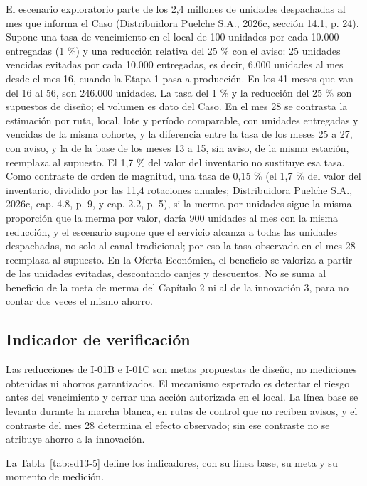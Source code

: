El escenario exploratorio parte de los 2,4 millones de unidades despachadas al mes que informa el Caso (Distribuidora Puelche S.A., 2026c, sección 14.1, p. 24). Supone una tasa de vencimiento en el local de 100 unidades por cada 10.000 entregadas (1 \%) y una reducción relativa del 25 \% con el aviso: 25 unidades vencidas evitadas por cada 10.000 entregadas, es decir, 6.000 unidades al mes desde el mes 16, cuando la Etapa 1 pasa a producción. En los 41 meses que van del 16 al 56, son 246.000 unidades. La tasa del 1 \% y la reducción del 25 \% son supuestos de diseño; el volumen es dato del Caso. En el mes 28 se contrasta la estimación por ruta, local, lote y período comparable, con unidades entregadas y vencidas de la misma cohorte, y la diferencia entre la tasa de los meses 25 a 27, con aviso, y la de la base de los meses 13 a 15, sin aviso, de la misma estación, reemplaza al supuesto. El 1,7 \% del valor del inventario no sustituye esa tasa. Como contraste de orden de magnitud, una tasa de 0,15 \% (el 1,7 \% del valor del inventario, dividido por las 11,4 rotaciones anuales; Distribuidora Puelche S.A., 2026c, cap. 4.8, p. 9, y cap. 2.2, p. 5), si la merma por unidades sigue la misma proporción que la merma por valor, daría 900 unidades al mes con la misma reducción, y el escenario supone que el servicio alcanza a todas las unidades despachadas, no solo al canal tradicional; por eso la tasa observada en el mes 28 reemplaza al supuesto. En la Oferta Económica, el beneficio se valoriza a partir de las unidades evitadas, descontando canjes y descuentos. No se suma al beneficio de la meta de merma del Capítulo 2 ni al de la innovación 3, para no contar dos veces el mismo ahorro.

\subsection{Indicador de verificación}

Las reducciones de I-01B e I-01C son metas propuestas de diseño, no mediciones obtenidas ni ahorros garantizados. El mecanismo esperado es detectar el riesgo antes del vencimiento y cerrar una acción autorizada en el local. La línea base se levanta durante la marcha blanca, en rutas de control que no reciben avisos, y el contraste del mes 28 determina el efecto observado; sin ese contraste no se atribuye ahorro a la innovación.

La Tabla~\ref{tab:sd13-5} define los indicadores, con su línea base, su meta y su momento de medición.

